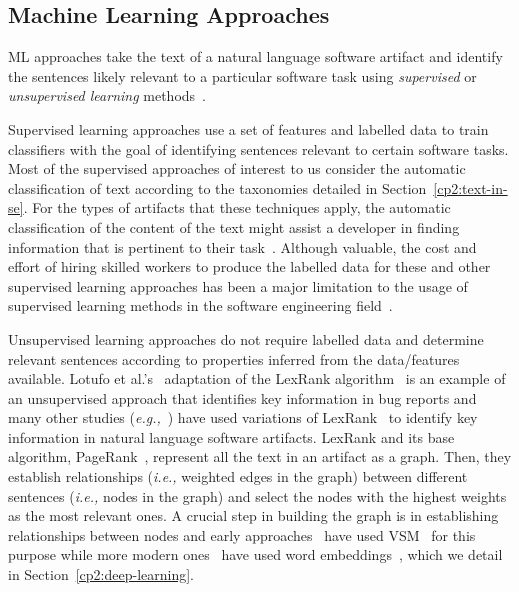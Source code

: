 

\subsection{Machine Learning Approaches}
\label{cp2:machine-learning}


\acf{ML} approaches take the text of a natural language software artifact and identify 
the sentences likely relevant to a particular software task using \textit{supervised} or 
\textit{unsupervised learning} methods~\cite{zhang2005machine}.



Supervised learning approaches use a set of features and labelled data
 to train classifiers with the goal of identifying sentences relevant to 
 certain software tasks.
Most of the supervised approaches of interest to us  
consider the automatic classification of text according to the taxonomies 
detailed in Section~\ref{cp2:text-in-se}.
For the types of artifacts that these techniques apply, 
the automatic classification of the 
 content of the text 
might assist a developer 
in finding information that is pertinent to their task~\cite{fucci2019, Arya2019}.
Although valuable, the cost and effort of hiring skilled workers to produce 
the labelled data for these and other supervised learning approaches
has been a major limitation 
to the usage of supervised learning 
methods in the software engineering field~\cite{Arpteg2018, ferreira2021}.



Unsupervised learning approaches do not require labelled data and determine 
relevant sentences according to properties inferred from the data/features available. 
Lotufo et al.'s~\cite{Lotufo2012} adaptation of the LexRank algorithm~\cite{Erkan2004} is an example of 
an unsupervised approach that identifies key information in bug reports
and many other studies (\textit{e.g.,}~\cite{Jiang2017, Ponzanelli2015,  Ponzanelli2017}) have used 
variations of LexRank~\cite{Erkan2004} to identify key information in natural
language software artifacts.
LexRank and its base algorithm, PageRank~\cite{Page1999}, represent all the text in an artifact as a graph.
Then, they establish relationships (\textit{i.e.,} weighted edges in the graph) 
between different sentences (\textit{i.e.,} nodes in the graph) 
and select the nodes with the highest weights as the most relevant ones.
A crucial step in building the graph is in  
establishing  relationships between nodes
and early approaches~\cite{Lotufo2012, Jiang2017} 
have used \ac{VSM}~\cite{Salton1975vsm} 
for this purpose while more modern ones~\cite{Huang2018, silva2019}
have used word embeddings~\cite{Mikolov2013, bojanowski2017FastText},
which we detail in Section~\ref{cp2:deep-learning}.




